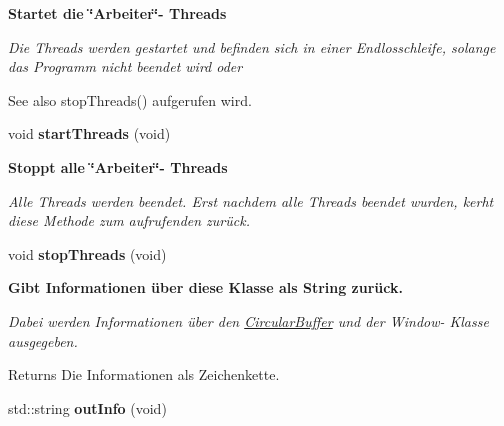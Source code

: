 \begin{Indent}{\bf Startet die \char`\"{}\+Arbeiter\char`\"{}-\/ Threads}\par
{\em Die Threads werden gestartet und befinden sich in einer Endlosschleife, solange das Programm nicht beendet wird oder

\begin{DoxySeeAlso}{See also}
stop\+Threads() aufgerufen wird. 
\end{DoxySeeAlso}
}\begin{DoxyCompactItemize}
\item 
\hypertarget{classrc_1_1BlobDetectorFactory_afecac9963fc4e69e51422ce59cf540f3}{void {\bfseries start\+Threads} (void)}\label{classrc_1_1BlobDetectorFactory_afecac9963fc4e69e51422ce59cf540f3}

\end{DoxyCompactItemize}
\end{Indent}
\begin{Indent}{\bf Stoppt alle \char`\"{}\+Arbeiter\char`\"{}-\/ Threads}\par
{\em Alle Threads werden beendet. Erst nachdem alle Threads beendet wurden, kerht diese Methode zum aufrufenden zurück. }\begin{DoxyCompactItemize}
\item 
\hypertarget{classrc_1_1BlobDetectorFactory_a9dc44508f5a3dd4beaee0813b7443194}{void {\bfseries stop\+Threads} (void)}\label{classrc_1_1BlobDetectorFactory_a9dc44508f5a3dd4beaee0813b7443194}

\end{DoxyCompactItemize}
\end{Indent}
\begin{Indent}{\bf Gibt Informationen über diese Klasse als String zurück.}\par
{\em Dabei werden Informationen über den \hyperlink{classrc_1_1CircularBuffer}{Circular\+Buffer} und der Window-\/ Klasse ausgegeben.

\begin{DoxyReturn}{Returns}
Die Informationen als Zeichenkette. 
\end{DoxyReturn}
}\begin{DoxyCompactItemize}
\item 
\hypertarget{classrc_1_1BlobDetectorFactory_a08e56c167bd2f928d2f808d429d8327e}{std\+::string {\bfseries out\+Info} (void)}\label{classrc_1_1BlobDetectorFactory_a08e56c167bd2f928d2f808d429d8327e}

\end{DoxyCompactItemize}
\end{Indent}
